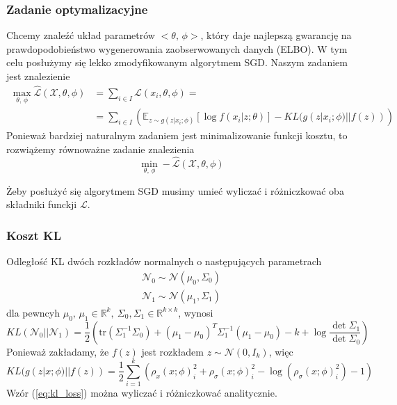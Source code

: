 \documentclass{iithesis}
\begin{document}
\subsubsection{Zadanie optymalizacyjne} \label{sec:optim_task}
Chcemy znaleźć układ parametrów $<\theta,\,\phi>$, który daje najlepszą
gwarancję na prawdopodobieństwo wygenerowania zaobserwowanych danych (ELBO).
W tym celu posłużymy się lekko zmodyfikowanym algorytmem SGD.
Naszym zadaniem jest znalezienie
\begin{equation}
\label{eq:loss_f}
\begin{split}
\max_{\theta,\,\phi} \hat{\mathcal{L}}(\mathcal{X}, \theta, \phi) &= \sum_{i \in I}\mathcal{L}(x_i, \theta, \phi) = \\
&=\sum_{i \in I} \left( \mathbb{E}_{z\sim g(z|x_i;\phi)}\left[\log f(x_i|z;\theta)\right] - KL(g(z|x_i;\phi) || f(z)) \right)
\end{split}
\end{equation}
Ponieważ bardziej naturalnym zadaniem jest minimalizowanie funkcji kosztu,
to rozwiążemy równoważne zadanie znalezienia
\begin{equation}
\min_{\theta,\,\phi} -\hat{\mathcal{L}}(\mathcal{X}, \theta, \phi)
\end{equation}

Żeby posłużyć się algorytmem SGD musimy umieć wyliczać i różniczkować
oba składniki funckji $\mathcal{L}$.

\subsubsection{Koszt KL}
Odległość KL dwóch rozkładów normalnych o następujących parametrach
\begin{equation*}
\begin{split}
\mathcal{N}_0 \sim \mathcal{N}(\mu_0, \Sigma_0) \\
\mathcal{N}_1 \sim \mathcal{N}(\mu_1, \Sigma_1)
\end{split}
\end{equation*}
dla pewncyh $\mu_0,\,\mu_1 \in \mathbb{R}^k,\ \Sigma_0, \Sigma_1 \in \mathbb{R}^{k \times k}$, wynosi
\begin{equation*}
KL(\mathcal{N}_0||\mathcal{N}_1) = \frac{1}{2} \left(\text{tr}(\Sigma_1^{-1}\Sigma_0)
+ (\mu_1-\mu_0)^T \Sigma_1^{-1} (\mu_1-\mu_0) -k + \log\frac{\det\Sigma_1}{\det\Sigma_0} \right)
\end{equation*}
Ponieważ zakładamy, że $f(z)$ jest rozkładem $z \sim \mathcal{N}(0, I_k)$, więc
\begin{equation}
KL(g(z|x;\phi) || f(z)) = \frac{1}{2}\sum_{i=1}^k
\left( \rho_x(x;\phi)_i^2 + \rho_\sigma(x;\phi)_i^2 - \log(\rho_\sigma(x;\phi)_i^2)-1 \right)
\label{eq:kl_loss}
\end{equation}
Wzór (\ref{eq:kl_loss}) można wyliczać i różniczkować analitycznie.
\end{document}
